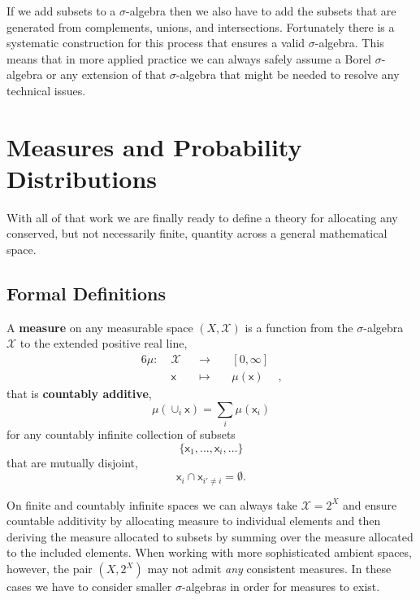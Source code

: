 \documentclass[
  letterpaper,
  DIV=11,
  numbers=noendperiod]{scrartcl}
\begin{document}
If we add subsets to a \(\sigma\)-algebra then we also have to add the
subsets that are generated from complements, unions, and intersections.
Fortunately there is a systematic construction for this process that
ensures a valid \(\sigma\)-algebra. This means that in more applied
practice we can always safely assume a Borel \(\sigma\)-algebra or any
extension of that \(\sigma\)-algebra that might be needed to resolve any
technical issues.

\hypertarget{measures-and-probability-distributions}{%
\section{Measures and Probability
Distributions}\label{measures-and-probability-distributions}}

With all of that work we are finally ready to define a theory for
allocating any conserved, but not necessarily finite, quantity across a
general mathematical space.

\hypertarget{formal-definitions}{%
\subsection{Formal Definitions}\label{formal-definitions}}

A \textbf{measure} on any measurable space \((X, \mathcal{X})\) is a
function from the \(\sigma\)-algebra \(\mathcal{X}\) to the extended
positive real line, \begin{alignat*}{6}
\mu :\; & \mathcal{X} & &\rightarrow& \; & [0, \infty] &
\\
& \mathsf{x} & &\mapsto& & \mu(\mathsf{x}) &,
\end{alignat*} that is \textbf{countably additive}, \[
\mu( \cup_{i} \mathsf{x} ) = \sum_{i} \mu( \mathsf{x}_{i} )
\] for any countably infinite collection of subsets \[
\{ \mathsf{x}_{1}, \ldots, \mathsf{x}_{i}, \ldots \}
\] that are mutually disjoint, \[
\mathsf{x}_{i} \cap \mathsf{x}_{i' \ne i} = \emptyset.
\]

On finite and countably infinite spaces we can always take
\(\mathcal{X} = 2^{X}\) and ensure countable additivity by allocating
measure to individual elements and then deriving the measure allocated
to subsets by summing over the measure allocated to the included
elements. When working with more sophisticated ambient spaces, however,
the pair \((X, 2^{X})\) may not admit \emph{any} consistent measures. In
these cases we have to consider smaller \(\sigma\)-algebras in order for
measures to exist.
\end{document}
